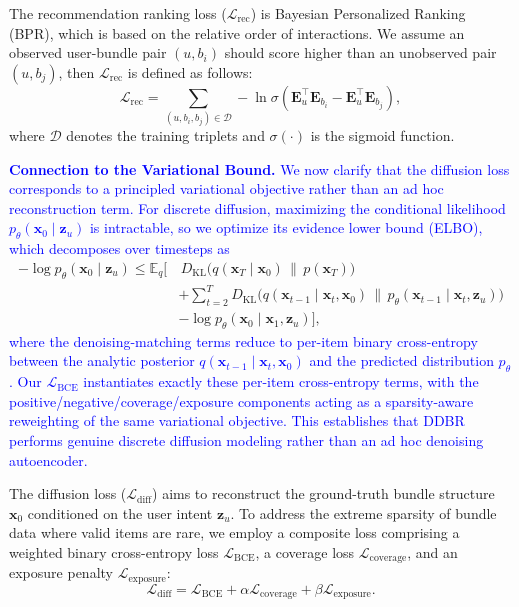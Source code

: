 \documentclass[lettersize,journal]{IEEEtran}
\newcommand{\revise}[1]{\textcolor{blue}{#1}}
\begin{document}
The recommendation ranking loss ($\mathcal{L}_{\mathrm{rec}}$) is Bayesian Personalized Ranking (BPR), which is based on the relative order of interactions. We assume an observed user-bundle pair $(u, b_i)$ should score higher than an unobserved pair $(u, b_j)$, then $\mathcal{L}_{\mathrm{rec}}$ is defined as follows:
\begin{equation}
    \mathcal{L}_{\mathrm{rec}} = \sum_{(u, b_i, b_j) \in \mathcal{D}} - \ln \sigma(\mathbf{E}_u^\top \mathbf{E}_{b_i} - \mathbf{E}_u^\top \mathbf{E}_{b_j}),
\end{equation}
where $\mathcal{D}$ denotes the training triplets and $\sigma(\cdot)$ is the sigmoid function.

\noindent\textbf{\revise{Connection to the Variational Bound.}}
\revise{We now clarify that the diffusion loss corresponds to a principled variational objective rather than an ad hoc reconstruction term. For discrete diffusion, maximizing the conditional likelihood $p_\theta(\mathbf{x}_0 \mid \mathbf{z}_u)$ is intractable, so we optimize its evidence lower bound (ELBO), which decomposes over timesteps as}
\begin{equation}
\begin{aligned}
-\log p_\theta(\mathbf{x}_0 \mid \mathbf{z}_u) \le \mathbb{E}_{q}\Big[ &\, D_{\mathrm{KL}}\big(q(\mathbf{x}_T \mid \mathbf{x}_0)\,\|\,p(\mathbf{x}_T)\big) \\
&+ \sum_{t=2}^{T} D_{\mathrm{KL}}\big(q(\mathbf{x}_{t-1} \mid \mathbf{x}_t, \mathbf{x}_0)\,\|\,p_\theta(\mathbf{x}_{t-1} \mid \mathbf{x}_t, \mathbf{z}_u)\big) \\
&- \log p_\theta(\mathbf{x}_0 \mid \mathbf{x}_1, \mathbf{z}_u) \Big],
\end{aligned}
\end{equation}
\revise{where the denoising-matching terms reduce to per-item binary cross-entropy between the analytic posterior $q(\mathbf{x}_{t-1} \mid \mathbf{x}_t, \mathbf{x}_0)$ and the predicted distribution $p_\theta$. Our $\mathcal{L}_{\mathrm{BCE}}$ instantiates exactly these per-item cross-entropy terms, with the positive/negative/coverage/exposure components acting as a sparsity-aware reweighting of the same variational objective. This establishes that DDBR performs genuine discrete diffusion modeling rather than an ad hoc denoising autoencoder.}

The diffusion loss ($\mathcal{L}_{\mathrm{diff}}$) aims to reconstruct the ground-truth bundle structure $\mathbf{x}_0$ conditioned on the user intent $\mathbf{z}_u$. To address the extreme sparsity of bundle data where valid items are rare, we employ a composite loss comprising a weighted binary cross-entropy loss $\mathcal{L}_{\mathrm{BCE}}$, a coverage loss $\mathcal{L}_{\mathrm{coverage}}$, and an exposure penalty $\mathcal{L}_{\mathrm{exposure}}$:
\begin{equation}
    \mathcal{L}_{\mathrm{diff}} = \mathcal{L}_{\mathrm{BCE}} + \alpha \mathcal{L}_{\mathrm{coverage}} + \beta \mathcal{L}_{\mathrm{exposure}}.
\end{equation}
\end{document}
